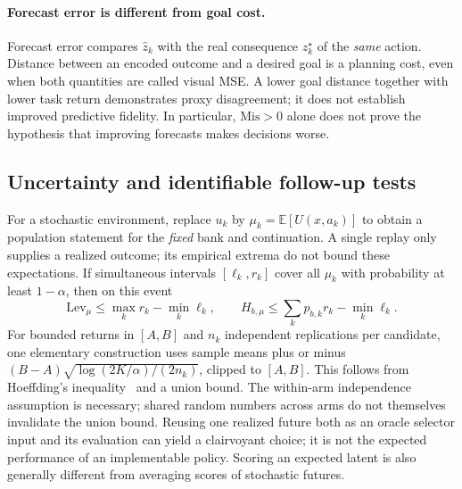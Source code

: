 {\paragraph{Forecast error is different from goal cost.}
Forecast error compares $\widehat z_k$ with the real consequence
$z_k^\star$ of the \emph{same} action. Distance between an encoded outcome
and a desired goal is a planning cost, even when both quantities are called
visual MSE. A lower goal distance together with lower task return
demonstrates proxy disagreement; it does not establish improved predictive
fidelity. In particular, $\mathrm{Mis}>0$ alone does not prove the hypothesis
that improving forecasts makes decisions worse.

\subsection{Uncertainty and identifiable follow-up tests}
For a stochastic environment, replace $u_k$ by
$\mu_k=\mathbb E[U(x,a_k)]$ to obtain a population statement for the
\emph{fixed} bank and continuation. A single replay only supplies a realized
outcome; its empirical extrema do not bound these expectations. If
simultaneous intervals $[\ell_k,r_k]$ cover all $\mu_k$ with probability
at least $1-\alpha$, then on this event
\begin{equation}
 \mathrm{Lev}_{\mu}\leq\max_k r_k-\min_k\ell_k,
 \qquad
 H_{b,\mu}\leq\sum_k p_{b,k}r_k-\min_k\ell_k.
 \label{eq:uncertain-bound}
\end{equation}
For bounded returns in $[A,B]$ and $n_k$ independent replications per
candidate, one elementary construction uses sample means plus or minus
$(B-A)\sqrt{\log(2K/\alpha)/(2n_k)}$, clipped to $[A,B]$.
This follows from Hoeffding's inequality~\cite{hoeffding1963bounds} and a
union bound. The within-arm
independence assumption is necessary; shared random numbers across arms
do not themselves invalidate the union bound. Reusing one realized future
both as an oracle selector input and its evaluation can yield a clairvoyant
choice; it is not the expected performance of an implementable policy.
Scoring an expected latent is also generally different from averaging
scores of stochastic futures.

}

